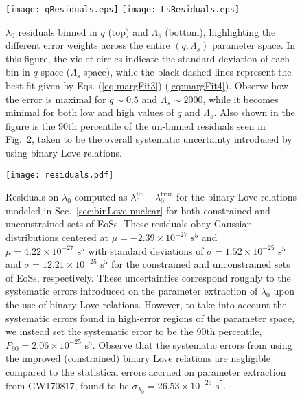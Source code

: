 \documentclass[prd,twocolumn,nofootinbib,superscriptaddress,amsmath,amssymb]{revtex4-1}
\begin{document}
\begin{figure}
\begin{center} 
\texttt{[image: qResiduals.eps]}
\texttt{[image: LsResiduals.eps]}
\end{center}
\caption{
$\lambda_0$ residuals binned in $q$ (top) and $\Lambda_s$ (bottom), highlighting the different error weights across the entire $(q,\Lambda_s)$ parameter space.
In this figure, the violet circles indicate the standard deviation of each bin in $q$-space ($\Lambda_s$-space), while the black dashed lines represent the best fit given by Eqs. (\ref{eq:margFit3})-(\ref{eq:margFit4}).
Observe how the error is maximal for $q\sim0.5$ and $\Lambda_s\sim2000$, while it becomes minimal for both low and high values of $q$ and $\Lambda_s$.
Also shown in the figure is the 90th percentile of the un-binned residuals seen in Fig.~\ref{fig:residuals}, taken to be the overall systematic uncertainty introduced by using binary Love relations.
}
\label{fig:qLsResiduals}
\end{figure}

\begin{figure}
\begin{center} 
\texttt{[image: residuals.pdf]}
\end{center}
\caption{
Residuals on $\lambda_0$ computed as $\lambda_0^{\text{fit}}-\lambda_0^{\text{true}}$ for the binary Love relations modeled in Sec.~\ref{sec:binLove-nuclear} for both constrained and unconstrained sets of EoSs.
These residuals obey Gaussian distributions centered at $\mu=-2.39 \times 10^{-27} \text{ s}^5$ and $\mu=4.22 \times 10^{-27} \text{ s}^5$ with standard deviations of $\sigma=1.52\times10^{-25} \text{ s}^5$ and $\sigma=12.21\times10^{-25} \text{ s}^5$ for the constrained and unconstrained sets of EoSs, respectively.
These uncertainties correspond roughly to the systematic errors introduced on the parameter extraction of $\lambda_0$ upon the use of binary Love relations.
However, to take into account the systematic errors found in high-error regions of the parameter space, we instead set the systematic error to be the 90th percentile, $P_{90}=2.06\times10^{-25} \text{ s}^5$.
Observe that the systematic errors from using the improved (constrained) binary Love relations are negligible compared to the statistical errors accrued on parameter extraction from GW170817, found to be $\sigma_{\lambda_0}=26.53 \times 10^{-25} \text{ s}^5$.
}
\label{fig:residuals}
\end{figure}
\end{document}
